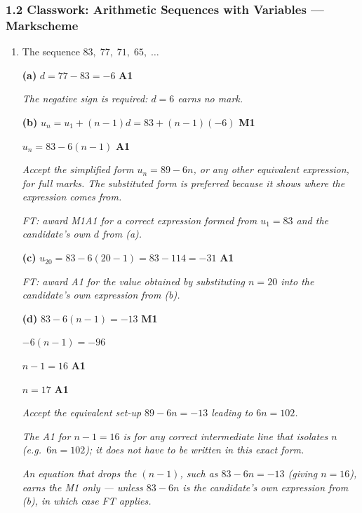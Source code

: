 \documentclass[12pt, twoside]{article}
\begin{document}
\subsubsection*{1.2 Classwork: Arithmetic Sequences with Variables --- Markscheme}

\begin{enumerate}[itemsep=0.3cm]

\item[1.] [Maximum mark: 7]

The sequence $83,\; 77,\; 71,\; 65,\; \ldots$

\medskip

\textbf{(a)} $d = 77 - 83 = -6$ \hfill \textbf{A1}

\emph{The negative sign is required: $d = 6$ earns no mark.}

\medskip

\textbf{(b)} $u_{n} = u_{1} + (n-1)d = 83 + (n-1)(-6)$ \hfill \textbf{M1}

$u_{n} = 83 - 6(n-1)$ \hfill \textbf{A1}

\emph{Accept the simplified form $u_{n} = 89 - 6n$, or any other equivalent
expression, for full marks. The substituted form is preferred because it shows
where the expression comes from.}

\emph{FT: award M1A1 for a correct expression formed from $u_{1} = 83$ and
the candidate's own $d$ from (a).}

\medskip

\textbf{(c)} $u_{20} = 83 - 6(20 - 1) = 83 - 114 = -31$ \hfill \textbf{A1}

\emph{FT: award A1 for the value obtained by substituting $n = 20$
into the candidate's own expression from (b).}

\medskip

\textbf{(d)} $83 - 6(n - 1) = -13$ \hfill \textbf{M1}

$-6(n - 1) = -96$

$n - 1 = 16$ \hfill \textbf{A1}

$n = 17$ \hfill \textbf{A1}

\emph{Accept the equivalent set-up $89 - 6n = -13$ leading to $6n = 102$.}

\emph{The A1 for $n - 1 = 16$ is for any correct intermediate line
that isolates $n$ (e.g.\ $6n = 102$); it does not have to be written
in this exact form.}

\emph{An equation that drops the $(n - 1)$, such as $83 - 6n = -13$
(giving $n = 16$), earns the M1 only --- unless $83 - 6n$ is the
candidate's own expression from (b), in which case FT applies.}


\end{enumerate}
\end{document}
